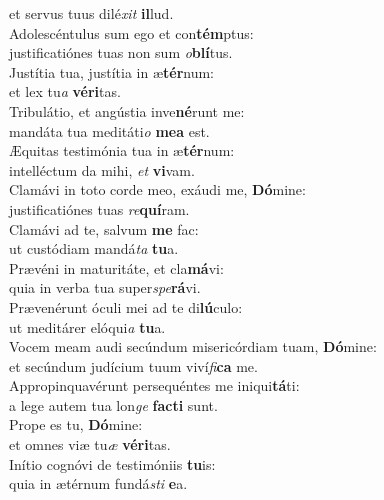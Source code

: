 \evenverse et servus tuus dilé\textit{xit} \textbf{il}lud.\\
\oddverse Adolescéntulus sum ego et con\textbf{tém}ptus:~\*\\
\oddverse justificatiónes tuas non sum \textit{o}\textbf{blí}tus.\\
\evenverse Justítia tua, justítia in æ\textbf{tér}num:~\*\\
\evenverse et lex tu\textit{a} \textbf{vé}\textbf{ri}tas.\\
\oddverse Tribulátio, et angústia inve\textbf{né}runt me:~\*\\
\oddverse mandáta tua meditáti\textit{o} \textbf{me}\textbf{a} est.\\
\evenverse Æquitas testimónia tua in æ\textbf{tér}num:~\*\\
\evenverse intelléctum da mihi, \textit{et} \textbf{vi}vam.\\
\oddverse Clamávi in toto corde meo, exáudi me, \textbf{Dó}mine:~\*\\
\oddverse justificatiónes tuas \textit{re}\textbf{quí}ram.\\
\evenverse Clamávi ad te, salvum \textbf{me} fac:~\*\\
\evenverse ut custódiam mandá\textit{ta} \textbf{tu}a.\\
\oddverse Prævéni in maturitáte, et cla\textbf{má}vi:~\*\\
\oddverse quia in verba tua super\textit{spe}\textbf{rá}vi.\\
\evenverse Prævenérunt óculi mei ad te di\textbf{lú}culo:~\*\\
\evenverse ut meditárer elóqui\textit{a} \textbf{tu}a.\\
\oddverse Vocem meam audi secúndum misericórdiam tuam, \textbf{Dó}mine:~\*\\
\oddverse et secúndum judícium tuum viví\textit{fi}\textbf{ca} me.\\
\evenverse Appropinquavérunt persequéntes me iniqui\textbf{tá}ti:~\*\\
\evenverse a lege autem tua lon\textit{ge} \textbf{fa}\textbf{cti} sunt.\\
\oddverse Prope es tu, \textbf{Dó}mine:~\*\\
\oddverse et omnes viæ tu\textit{æ} \textbf{vé}\textbf{ri}tas.\\
\evenverse Inítio cognóvi de testimóniis \textbf{tu}is:~\*\\
\evenverse quia in ætérnum fundá\textit{sti} \textbf{e}a.\\

